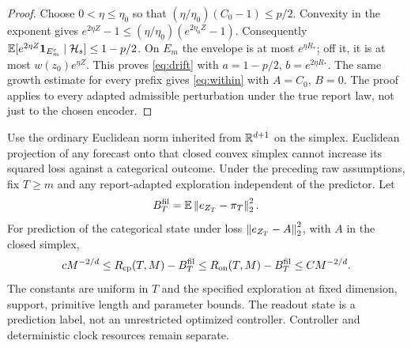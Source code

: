 \begin{proof}
Choose $0<\eta\le\eta_0$ so that $(\eta/\eta_0)(C_0-1)\le p/2$. Convexity in the exponent gives
$e^{2\eta Z}-1\le(\eta/\eta_0)(e^{2\eta_0Z}-1)$.
Consequently $\mathbb E[e^{2\eta Z}\mathbf 1_{E_m^c}\mid\mathcal H_s]\le1-p/2$. On $E_m$ the envelope is at most $e^{\eta R_*}$; off it, it is at most $w(z_0)e^{\eta Z}$. This proves \eqref{eq:drift} with $a=1-p/2$, $b=e^{2\eta R_*}$. The same growth estimate for every prefix gives \eqref{eq:within} with $A=C_0$, $B=0$. The proof applies to every adapted admissible perturbation under the true report law, not just to the chosen encoder.
\end{proof}

\begin{theorem}\label{thm:brier}
Use the ordinary Euclidean norm inherited from $\mathbb R^{d+1}$ on the simplex. Euclidean projection of any forecast onto that closed convex simplex cannot increase its squared loss against a categorical outcome.
Under the preceding raw assumptions, fix $T\ge m$ and any report-adapted exploration independent of the predictor. Let
\[
 B_T^{\rm fil}=\mathbb E\left\lVert e_{Z_T}-\pi_T\right\rVert_2^2.
\]
For prediction of the categorical state under loss $\left\lVert e_{Z_T}-A\right\rVert^2_2$, with $A$ in the closed simplex,
\begin{equation}\label{eq:brier}
 cM^{-2/d}\le R_{\mathrm{cp}}(T,M)-B_T^{\rm fil}
 \le R_{\mathrm{on}}(T,M)-B_T^{\rm fil}\le CM^{-2/d}.
\end{equation}
The constants are uniform in $T$ and the specified exploration at fixed dimension, support, primitive length and parameter bounds. The readout state is a prediction label, not an unrestricted optimized controller. Controller and deterministic clock resources remain separate.
\end{theorem}
